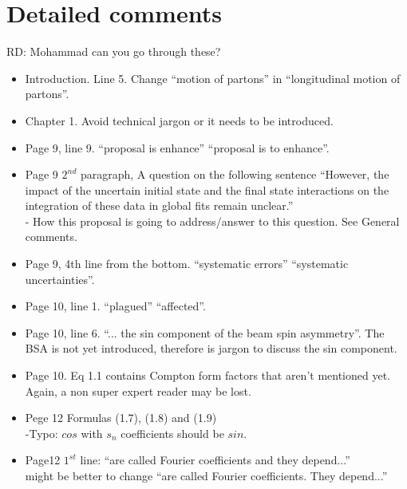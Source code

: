 \section*{Detailed comments} 

{\color{red}RD: Mohammad can you go through these?}

 \begin{itemize}
 
  \item Introduction. Line 5. Change ``motion of partons'' in ``longitudinal motion of partons''.
  
  \item Chapter 1. Avoid technical jargon or it needs to be introduced.
  
  \item Page 9, line 9. ``proposal is enhance'' \rarr ``proposal is to enhance''.

    \item  Page 9 $2^{nd}$ paragraph, A question on the following sentence  ``However, the impact of the uncertain initial state and the final state interactions on the integration of these data in global fits remain unclear.'' \\
  - How this proposal is going to address/answer to this question. See General comments.

  \item Page 9,  4th line from the bottom. ``systematic errors'' \rarr ``systematic uncertainties''.
  
  \item Page 10, line 1. ``plagued'' \rarr ``affected''.
  
  \item Page 10, line 6. ``... the sin component of the beam spin asymmetry''. The BSA is not yet introduced, therefore is jargon to discuss the sin component.
  
  \item Page 10. Eq 1.1 contains Compton form factors that aren't mentioned yet. Again, a non super expert reader may be lost.
  
  
  \item Pege 12 Formulas (1.7), (1.8) and (1.9) \\
  -Typo: $cos$ with $s_{n}$ coefficients should be $sin$.
  \item Page12 $1^{st}$ line:  ``are called Fourier coefficients and they depend...'' \\
  might be better to change ``are called Fourier coefficients. They depend...''
  

\end{itemize}
